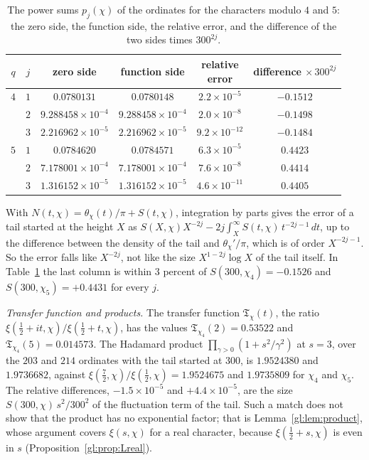 \begin{table}[htbp]
\caption{The power sums $p_j(\chi)$ of the ordinates for the characters modulo $4$ and $5$: the zero side, the function side, the relative error, and the difference of the two sides times $300^{2j}$.}
\label{gl:tab:powersums}
\centering
\small
\begin{tabular}{cccccc}
\toprule
$q$ & $j$ & zero side & function side & \shortstack{relative\\error} & \shortstack{difference\\ $\times\,300^{2j}$}\\
\midrule
$4$ & $1$ & $0.0780131$ & $0.0780148$ & $2.2\times10^{-5}$ & $-0.1512$\\
 & $2$ & $9.288458\times10^{-4}$ & $9.288458\times10^{-4}$ & $2.0\times10^{-8}$ & $-0.1498$\\
 & $3$ & $2.216962\times10^{-5}$ & $2.216962\times10^{-5}$ & $9.2\times10^{-12}$ & $-0.1484$\\
\midrule
$5$ & $1$ & $0.0784620$ & $0.0784571$ & $6.3\times10^{-5}$ & $0.4423$\\
 & $2$ & $7.178001\times10^{-4}$ & $7.178001\times10^{-4}$ & $7.6\times10^{-8}$ & $0.4414$\\
 & $3$ & $1.316152\times10^{-5}$ & $1.316152\times10^{-5}$ & $4.6\times10^{-11}$ & $0.4405$\\
\bottomrule
\end{tabular}
\end{table}
With $N(t,\chi)=\theta_\chi(t)/\pi+S(t,\chi)$, integration by parts gives the error of a tail started at the height $X$ as $S(X,\chi)X^{-2j}-2j\int_X^\infty S(t,\chi)\,t^{-2j-1}\,dt$, up to the difference between the density of the tail and $\theta_\chi'/\pi$, which is of order $X^{-2j-1}$. So the error falls like $X^{-2j}$, not like the size $X^{1-2j}\log X$ of the tail itself. In Table~\ref{gl:tab:powersums} the last column is within $3$ percent of $S(300,\chi_4)=-0.1526$ and $S(300,\chi_5)=+0.4431$ for every $j$.

\emph{Transfer function and products.} The transfer function $\mathfrak T_\chi(t)$, the ratio $\xi(\tfrac12+it,\chi)/\xi(\tfrac12+t,\chi)$, has the values $\mathfrak T_{\chi_4}(2)=0.53522$ and $\mathfrak T_{\chi_4}(5)=0.014573$. The Hadamard product $\prod_{\gamma>0}(1+s^2/\gamma^2)$ at $s=3$, over the $203$ and $214$ ordinates with the tail started at $300$, is $1.9524380$ and $1.9736682$, against $\xi(\tfrac72,\chi)/\xi(\tfrac12,\chi)=1.9524675$ and $1.9735809$ for $\chi_4$ and $\chi_5$. The relative differences, $-1.5\times10^{-5}$ and $+4.4\times10^{-5}$, are the size $S(300,\chi)\,s^2/300^2$ of the fluctuation term of the tail. Such a match does not show that the product has no exponential factor; that is Lemma~\ref{gl:lem:product}, whose argument covers $\xi(s,\chi)$ for a real character, because $\xi(\tfrac12+s,\chi)$ is even in $s$ (Proposition~\ref{gl:prop:Lreal}).

